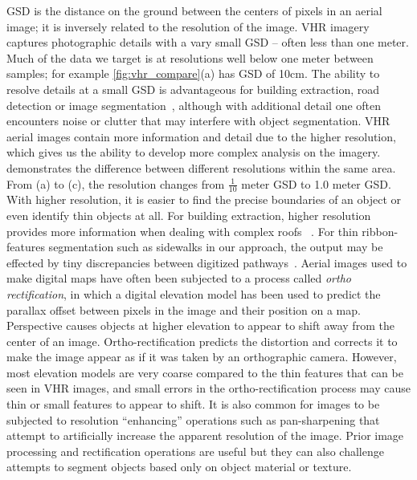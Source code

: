 \ac{GSD} is the distance on the ground between the centers of pixels in an aerial image; it is
inversely related to the resolution of the image. \ac{VHR} imagery captures photographic details
with a vary small \ac{GSD} -- often less than one meter. Much of the data we target is at
resolutions well below one meter between samples; for example \ref{fig:vhr_compare}(a) has \ac{GSD}
of 10cm. The ability to resolve details at a small \ac{GSD} is advantageous for building
extraction, road detection or image segmentation~\cite{FREIRE20141, 10.1007/BFb0015525,
10.1007/978-3-642-15567-3_16}, although with additional detail one often encounters noise
or clutter that may interfere with object segmentation. \ac{VHR} aerial
images contain more information and detail due to the higher resolution, which gives us the ability
to develop more complex analysis on the imagery. 
demonstrates the difference between different resolutions within the same area. From (a) to (c), the
resolution changes from $\frac{1}{10}$ meter \ac{GSD} to 1.0 meter \ac{GSD}. With higher resolution,
it is easier to find the precise boundaries of an object or even identify thin objects at all. For
building extraction, higher resolution provides more information when dealing with complex roofs
~\cite{10.1007/BFb0015525}. For thin ribbon-features segmentation such
as sidewalks in our approach, the output may be effected by tiny discrepancies between digitized
pathways~\cite{10.1007/978-3-642-15567-3_16}. Aerial images used to make digital maps have often
been subjected to  a process called \textit{ortho rectification}, in which a digital elevation model
has been used to predict the parallax offset between pixels in the image and their position on a
map. Perspective causes objects at higher elevation to appear to shift away from the center of an
image. Ortho-rectification predicts the distortion and corrects it to make the image appear as if it
was taken by an orthographic camera. However, most elevation models are very coarse compared to the
thin features that can be seen in \ac{VHR} images, and small errors in the ortho-rectification
process may cause thin or small features to appear to shift. It is also common for images to be
subjected to resolution ``enhancing'' operations such as pan-sharpening that attempt to artificially
increase the apparent resolution of the image. Prior image processing and rectification operations are 
useful but they can also challenge attempts to segment objects based only on object material or texture. 
 
